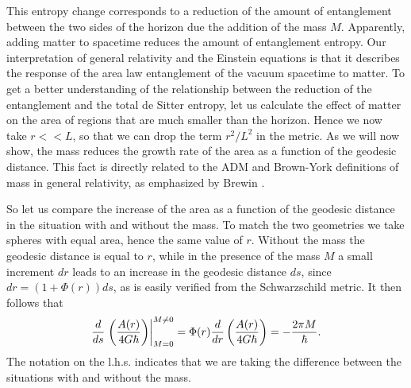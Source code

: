 \documentclass[a4paper,12pt]{article}
\newcommand{\be}{\begin{equation}}
\newcommand{\ee}{\end{equation}}
\begin{document}
This entropy change corresponds to a reduction of the amount of entanglement between the two sides of the horizon due the addition of the mass $M$.  Apparently, adding matter to spacetime reduces the amount of entanglement entropy. Our interpretation of general relativity and the Einstein equations is that it describes the response of the area law entanglement of the vacuum spacetime to matter. 
To get a better understanding of the relationship between the reduction of the entanglement and the total de Sitter entropy, let us calculate the effect of matter on the area of regions that are much smaller than the horizon. Hence we now take $r\!<\!\!<\!L$, so that we can drop the term $r^2/L^2$ in the metric. As we will now show, the mass reduces the growth rate of  the area as a function of the geodesic distance. This fact is directly related to the ADM and Brown-York \cite{BrownYork} definitions of mass in general relativity, as emphasized by Brewin \cite{Brewin}. 

So let us compare the increase of the area as a function of the geodesic distance in the situation with and without the mass. To match the two geometries we take spheres with equal area, hence the same value of $r$. Without the mass the geodesic distance is equal to $r$, while in the presence of the mass $M$ a small increment $dr$ leads to an increase in the geodesic distance $ds$, since  $dr = (1+\Phi(r))ds$, as is easily verified from the Schwarzschild metric. It then follows that%
 \be
\label{deficit}
{d\over ds} \left.\left(  {A(r)\over 4G\hbar} \right)\right  |^{M\neq 0}_{M=0} = 
\Phi(r){d \over dr}\left({A(r)\over 4G\hbar}\right) = -{2\pi M\over \hbar} .
\ee
The notation on the l.h.s. indicates that we are taking the 
difference between the situations with and without the mass.   
\end{document}
